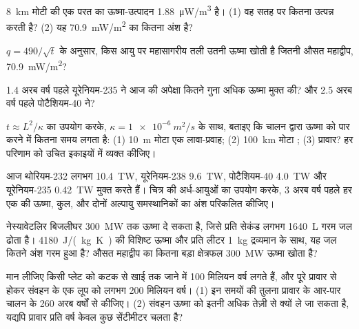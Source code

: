 \begin{exercise}[$\star\star$]\label{exo:g12:internal-heat:8}
\qty{8}{km} मोटी  की एक परत का ऊष्मा-उत्पादन
\qty{1.88}{\micro W/m^3} है। (1) वह सतह पर कितना  उत्पन्न करती है?
(2) यह \qty{70.9}{mW/m^2} का कितना अंश है?
\end{exercise}

\begin{exercise}[$\star\star$]\label{exo:g12:internal-heat:9}
$q = 490/\sqrt{t}$ के अनुसार, किस आयु पर महासागरीय तली उतनी ऊष्मा खोती है जितनी औसत महाद्वीप,
\qty{70.9}{mW/m^2}?
\end{exercise}

\begin{exercise}[$\star\star$]\label{exo:g12:internal-heat:10}
1.4 अरब वर्ष पहले यूरेनियम-235 ने आज की अपेक्षा कितने गुना अधिक ऊष्मा मुक्त की?
और 2.5 अरब वर्ष पहले पोटैशियम-40 ने?
\end{exercise}

\begin{exercise}[$\star\star$]\label{exo:g12:internal-heat:11}
$t \approx L^2/\kappa$ का उपयोग करके, $\kappa = \qty{1e-6}{m^2/s}$ के साथ, बताइए कि
चालन द्वारा ऊष्मा को पार करने में कितना समय लगता है: (1) \qty{10}{m} मोटा एक लावा-प्रवाह;
(2) \qty{100}{km} मोटा ; (3) प्रावार? हर परिणाम को
उचित इकाइयों में व्यक्त कीजिए।
\end{exercise}

\begin{exercise}[$\star\star\star$]\label{exo:g12:internal-heat:12}
आज थोरियम-232 लगभग \qty{10.4}{TW}, यूरेनियम-238 \qty{9.6}{TW},
पोटैशियम-40 \qty{4.0}{TW} और यूरेनियम-235 \qty{0.42}{TW} मुक्त करते हैं। चित्र की
अर्ध-आयुओं का उपयोग करके, 3 अरब वर्ष पहले हर एक की ऊष्मा,
कुल, और दोनों अल्पायु
समस्थानिकों का अंश परिकलित कीजिए।
\end{exercise}

\begin{exercise}[$\star\star\star$]\label{exo:g12:internal-heat:13}
नेस्यावेटलिर बिजलीघर \qty{300}{MW} तक ऊष्मा दे सकता है,
जिसे प्रति सेकंड लगभग \qty{1640}{L} गरम जल ढोता है। \qty{4180}{J/(kg.K)} की विशिष्ट ऊष्मा
और प्रति लीटर \qty{1}{kg} द्रव्यमान के साथ, यह जल कितने
अंश गरम हुआ है? औसत महाद्वीप का कितना बड़ा क्षेत्रफल
\qty{300}{MW} ऊष्मा खोता है?
\end{exercise}

\begin{exercise}[$\star\star\star$]\label{exo:g12:internal-heat:14}
मान लीजिए किसी प्लेट को कटक से खाई तक जाने में 100 मिलियन वर्ष लगते हैं, और
पूरे प्रावार से होकर संवहन के एक लूप को लगभग 200 मिलियन वर्ष। (1)
इन समयों की तुलना प्रावार के आर-पार चालन के 260 अरब वर्षों से कीजिए।
(2) संवहन ऊष्मा को इतनी अधिक तेज़ी से क्यों ले जा सकता है, यद्यपि
प्रावार प्रति वर्ष केवल कुछ सेंटीमीटर चलता है?
\end{exercise}

